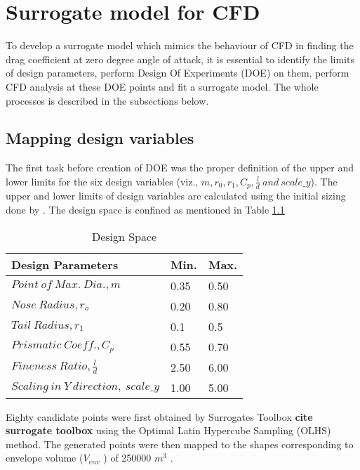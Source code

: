\chapter{Surrogate model for CFD}
To develop a surrogate model which mimics the behaviour of CFD in finding the drag coefficient at zero degree angle of attack, it is essential to identify the limits of design parameters, perform Design Of Experiments (DOE) on them, perform CFD analysis at these DOE points and fit a surrogate model. The whole processes is described in the subsections below.

\section{Mapping design variables}
The first task before creation of DOE was the proper definition of the upper and lower limits for the six design variables (viz., $ m, r_0, r_1, C_p, \frac{l}{d} \ and \  scale \_y $). The upper and lower limits of design variables are calculated using the initial sizing done by \cite{alam2017thesis}. The design space is confined as mentioned in Table \ref{Degign space }

\begin{table}[H]
	\centering
	\caption{Design Space}
	\label{Degign space }
	\begin{tabular}{lll}
		\hline \hline
		Design Parameters & Min. & Max.    \\ \hline \hline
		
		$ Point\ of\ Max.\ Dia., m$ & 0.35 & 0.50     \\  
		$ Nose\ Radius, r _{o} $ & 0.20 & 0.80     \\
		$ Tail\ Radius, r _{1} $ & 0.1 & 0.5     \\  
		$ Prismatic\ Coeff., C _{p }$ & 0.55 & 0.70 \\
		$ Fineness\ Ratio, \frac{l}{d} $ &2.50 & 6.00 \\
		$Scaling\ in\ Y\ direction,\ scale\_y$ &1.00 & 5.00\\ \hline \hline
	\end{tabular}
\end{table}

Eighty candidate points were first obtained by Surrogates Toolbox \textbf{cite surrogate toolbox} using the Optimal Latin Hypercube Sampling (OLHS) method. The generated points were then mapped to the shapes corresponding to envelope volume ($ V _{env} $ ) of 250000 $ m^3 $ . 


